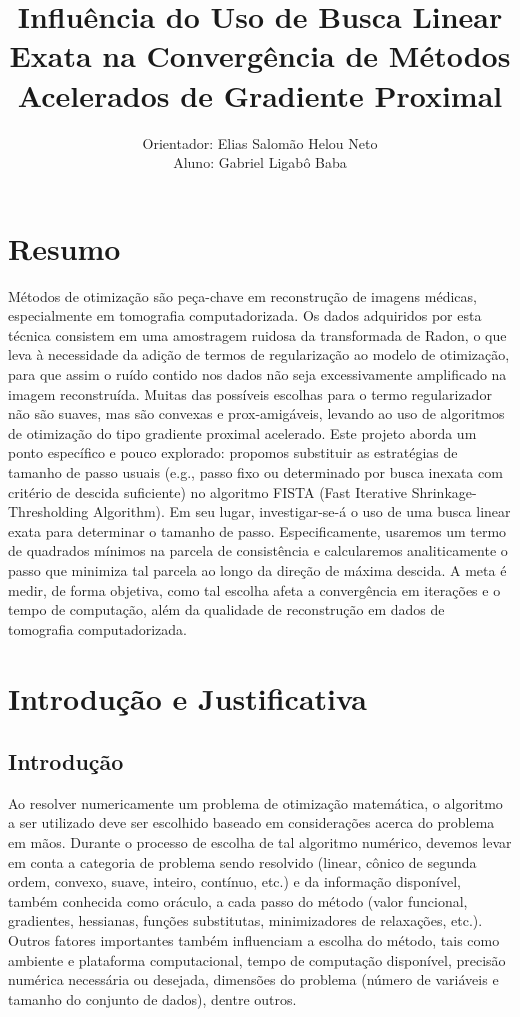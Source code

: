 \documentclass[12pt]{article}
\title{Influência do Uso de Busca Linear Exata na Convergência de Métodos Acelerados de Gradiente Proximal}
\author{Orientador: Elias Salomão Helou Neto\\Aluno: Gabriel Ligabô Baba}
\begin{document}
\maketitle

\section*{Resumo}

Métodos de otimização são peça-chave em reconstrução de imagens médicas, especialmente em tomografia computadorizada. Os dados adquiridos por esta técnica consistem em uma amostragem ruidosa da transformada de Radon, o que leva à necessidade da adição de termos de regularização ao modelo de otimização, para que assim o ruído contido nos dados não seja excessivamente amplificado na imagem reconstruída. Muitas das possíveis escolhas para o termo regularizador não são suaves, mas são convexas e prox-amigáveis, levando ao uso de algoritmos de otimização do tipo gradiente proximal acelerado. Este projeto aborda um ponto específico e pouco explorado: propomos substituir as estratégias de tamanho de passo usuais (e.g., passo fixo ou determinado por busca inexata com critério de descida suficiente) no algoritmo FISTA (Fast Iterative Shrinkage-Thresholding Algorithm). Em seu lugar, investigar-se-á o uso de uma busca linear exata para determinar o tamanho de passo. Especificamente, usaremos um termo de quadrados mínimos na parcela de consistência e calcularemos analiticamente o passo que minimiza tal parcela ao longo da direção de máxima descida. A meta é medir, de forma objetiva, como tal escolha afeta a convergência em iterações e o tempo de computação, além da qualidade de reconstrução em dados de tomografia computadorizada.

\section{Introdução e Justificativa}

\subsection{Introdução}

Ao resolver numericamente um problema de otimização matemática, o algoritmo a ser utilizado deve ser escolhido baseado em considerações acerca do problema em mãos. Durante o processo de escolha de tal algoritmo numérico, devemos levar em conta a categoria de problema sendo resolvido (linear, cônico de segunda ordem, convexo, suave, inteiro, contínuo, etc.) e da informação disponível, também conhecida como oráculo, a cada passo do método (valor funcional, gradientes, hessianas, funções substitutas, minimizadores de relaxações, etc.). Outros fatores importantes também influenciam a escolha do método, tais como ambiente e plataforma computacional, tempo de computação disponível, precisão numérica necessária ou desejada, dimensões do problema (número de variáveis e tamanho do conjunto de dados), dentre outros.
\end{document}
